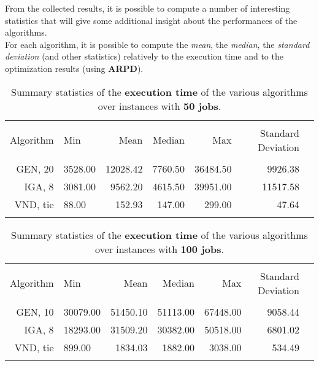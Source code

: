 \documentclass[
12pt,
a4paper,
oneside,
headinclude,
footinclude]{article}
\theoremstyle{definition} %
\begin{document}
From the collected results, it is possible to compute a number of interesting statistics that will give some additional insight about the performances of the algorithms.\\
For each algorithm, it is possible to compute the \textit{mean}, the \textit{median}, the \textit{standard deviation} (and other statistics) relatively to the execution time and to the optimization results (using \textbf{ARPD}).\\


\begin{table}[H]
    \centering
    \begin{tabular}{rlrrrrr}
        \hline
        \\[-1.5ex]
        Algorithm & Min & Mean & Median & Max & Standard Deviation \\ 
        \hline
        \\[-1.5ex]
        GEN, 20 & 3528.00 & 12028.42 & 7760.50 & 36484.50 & 9926.38 \\ 
        IGA, 8 & 3081.00 & 9562.20 & 4615.50 & 39951.00 & 11517.58 \\ 
        VND, tie & 88.00 & 152.93 & 147.00 & 299.00 & 47.64 \\ 
        \\[-1.6ex]
        \hline
    \end{tabular}
    \caption{\label{tab:50-time}Summary statistics of the \textbf{execution time} of the various algorithms over instances with \textbf{50 jobs}.}
\end{table}

\begin{table}[H]
    \centering
    \begin{tabular}{rlrrrrr}
        \hline
        \\[-1.5ex]
        Algorithm & Min & Mean & Median & Max & Standard Deviation \\ 
        \hline
        \\[-1.5ex]
        GEN, 10 & 30079.00 & 51450.10 & 51113.00 & 67448.00 & 9058.44 \\ 
        IGA, 8  & 18293.00 & 31509.20 & 30382.00 & 50518.00 & 6801.02 \\ 
        VND, tie & 899.00 & 1834.03 & 1882.00 & 3038.00 & 534.49 \\ 
        \\[-1.6ex] 
        \hline
    \end{tabular}
    \caption{\label{tab:100-time}Summary statistics of the \textbf{execution time} of the various algorithms over instances with \textbf{100 jobs}.}
\end{table}
\end{document}
